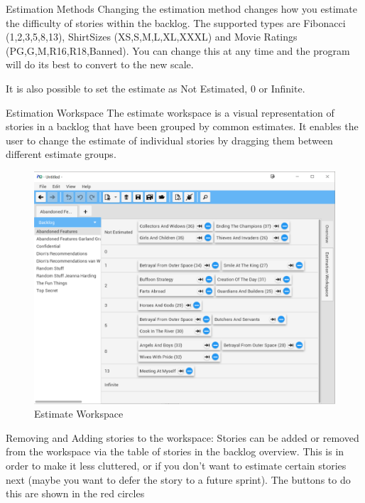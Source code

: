 \bigskip
Estimation Methods
\newline
Changing the estimation method changes how you estimate the difficulty of stories within the backlog. The supported types are Fibonacci (1,2,3,5,8,13), ShirtSizes (XS,S,M,L,XL,XXXL) and Movie Ratings (PG,G,M,R16,R18,Banned). You can change this at any time and the program will do its best to convert to the new scale. 

It is also possible to set the estimate as Not Estimated, 0 or Infinite.

\pagebreak
Estimation Workspace
\newline
The estimate workspace is a visual representation of stories in a backlog that have been grouped by common estimates. It enables the user to change the estimate of individual stories by dragging them between different estimate groups.

\begin{figure}[H]
\centering
\includegraphics[width=\textwidth]{images/screenshots/estimationWorkspace1.PNG}
\caption{Estimate Workspace}
\label{fig:new_project}
\end{figure}

\pagebreak
Removing and Adding stories to the workspace:
Stories can be added or removed from the workspace via the table of stories in the backlog overview. This is in order to make it less cluttered, or if you don't want to estimate certain stories next (maybe you want to defer the story to a future sprint).
The buttons to do this are shown in the red circles

